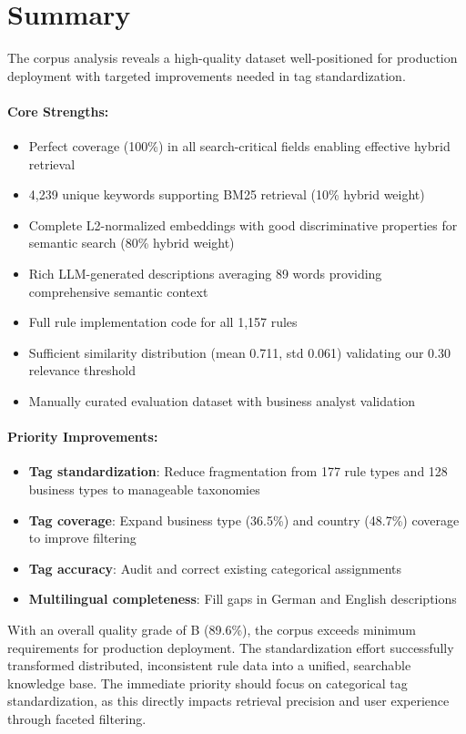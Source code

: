\section{Summary}

The corpus analysis reveals a high-quality dataset well-positioned for production deployment with targeted improvements needed in tag standardization.

\paragraph{Core Strengths:}
\begin{itemize}[leftmargin=*,itemsep=2pt,topsep=2pt]
 \item Perfect coverage (100\%) in all search-critical fields enabling effective hybrid retrieval
 \item 4,239 unique keywords supporting BM25 retrieval (10\% hybrid weight)
 \item Complete L2-normalized embeddings with good discriminative properties for semantic search (80\% hybrid weight)
 \item Rich LLM-generated descriptions averaging 89 words providing comprehensive semantic context
 \item Full rule implementation code for all 1,157 rules
 \item Sufficient similarity distribution (mean 0.711, std 0.061) validating our 0.30 relevance threshold
 \item Manually curated evaluation dataset with business analyst validation
\end{itemize}

\paragraph{Priority Improvements:}
\begin{itemize}[leftmargin=*,itemsep=2pt,topsep=2pt]
 \item \textbf{Tag standardization}: Reduce fragmentation from 177 rule types and 128 business types to manageable taxonomies
 \item \textbf{Tag coverage}: Expand business type (36.5\%) and country (48.7\%) coverage to improve filtering
 \item \textbf{Tag accuracy}: Audit and correct existing categorical assignments
 \item \textbf{Multilingual completeness}: Fill gaps in German and English descriptions
\end{itemize}

With an overall quality grade of B (89.6\%), the corpus exceeds minimum requirements for production deployment. The standardization effort successfully transformed distributed, inconsistent rule data into a unified, searchable knowledge base. The immediate priority should focus on categorical tag standardization, as this directly impacts retrieval precision and user experience through faceted filtering.
